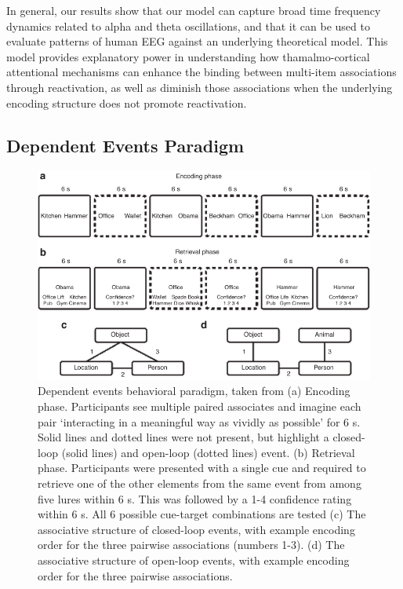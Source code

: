 \documentclass[11pt, titlepage, twoside]{article}
\begin{document}
In general, our results show that our model can capture broad time frequency dynamics related to alpha and theta oscillations, and that it can be used to evaluate patterns of human EEG against an underlying theoretical model.  This model provides explanatory power in understanding how thamalmo-cortical attentional mechanisms can enhance the binding between multi-item associations through reactivation, as well as diminish those associations when the underlying encoding structure does not promote reactivation.  


\subsection{Dependent Events Paradigm}

\begin{figure}
    \begin{center}
	\includegraphics[width=.9\textwidth]{figs/deev.pdf}
    \end{center}
      \caption[Dependent Events Paradigm]{
       Dependent events behavioral paradigm, taken from \textcite{HornerBisbyBushEtAl15} (a) Encoding phase. Participants see multiple paired associates and imagine each pair `interacting in a meaningful way as vividly as possible' for 6 s. Solid lines and dotted lines were not present, but highlight a closed-loop (solid lines) and open-loop (dotted lines) event. (b) Retrieval phase.  Participants were presented with a single cue and required to retrieve one of the other elements from the same event from among five lures within 6 s. This was followed by a 1-4 confidence rating within 6 s.  All 6 possible cue-target combinations are tested (c) The associative structure of closed-loop events, with example encoding order for the three pairwise associations (numbers 1-3). (d) The associative structure of open-loop events, with example encoding order for the three pairwise associations.
	}
     \label{fig:deev}
\end{figure}
\end{document}
